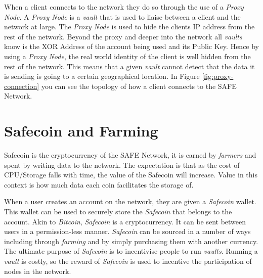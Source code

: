 When a client connects to the network they do so through the use of a \textit{Proxy Node}. A \textit{Proxy Node} is a \textit{vault} that is used to liaise between a client and the network at large. The \textit{Proxy Node} is used to hide the clients IP address from the rest of the network. Beyond the proxy and deeper into the network all \textit{vaults} know is the XOR Address of the account being used and its Public Key. Hence by using a \textit{Proxy Node}, the real world identity of the client is well hidden from the rest of the network. This means that a given \textit{vault} cannot detect that the data it is sending is going to a certain geographical location. In Figure \ref{fig:proxy-connection} you can see the topology of how a client connects to the SAFE Network.

\section{Safecoin and Farming}

Safecoin\cite{lambert2015safecoin} is the cryptocurrency of the SAFE Network, it is earned by \textit{farmers} and spent by writing data to the network. The expectation is that as the cost of CPU/Storage falls with time, the value of the Safecoin will increase. Value in this context is how much data each coin facilitates the storage of.

When a user creates an account on the network, they are given a \textit{Safecoin} wallet. This wallet can be used to securely store the \textit{Safecoin} that belongs to the account. Akin to \textit{Bitcoin}, \textit{Safecoin} is a cryptocurrency. It can be sent between users in a permission-less manner. \textit{Safecoin} can be sourced in a number of ways including through \textit{farming} and by simply purchasing them with another currency. The ultimate purpose of \textit{Safecoin} is to incentivise people to run \textit{vaults}. Running a \textit{vault} is costly, so the reward of \textit{Safecoin} is used to incentive the participation of nodes in the network.


